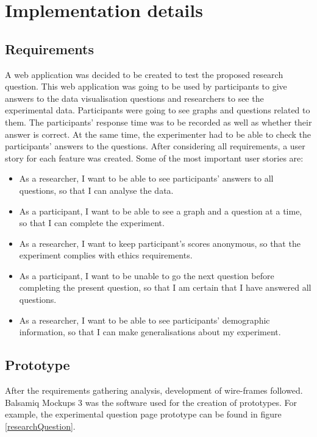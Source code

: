 \documentclass{l4proj}
\begin{document}
\chapter{Implementation details}

\section{Requirements}
\label{Requirements}

A web application was decided to be created to test the proposed research question. This web application was going to be used by participants to give answers to the data visualisation questions and researchers to see the experimental data. Participants were going to see graphs and questions related to them. The participants' response time was to be recorded as well as whether their answer is correct. At the same time, the experimenter had to be able to check the participants' answers to the questions. After considering all requirements, a user story for each feature was created. Some of the most important user stories are:

\begin{itemize}
   \item As a researcher, I want to be able to see participants' answers to all questions, so that I can analyse the data.
   \item As a participant, I want to be able to see a graph and a question at a time, so that I can complete the experiment.
   \item As a researcher, I want to keep participant's scores anonymous, so that the experiment complies with ethics requirements.
   \item As a participant, I want to be unable to go the next question before completing the present question, so that I am certain that I have answered all questions.
   \item As a researcher, I want to be able to see participants' demographic information, so that I can make generalisations about my experiment.
\end{itemize}

\section{Prototype}
After the requirements gathering analysis, development of wire-frames followed. Balsamiq Mockups 3 was the software used for the creation of prototypes. For example, the experimental question page prototype can be found in figure \ref{researchQuestion}.
\end{document}
